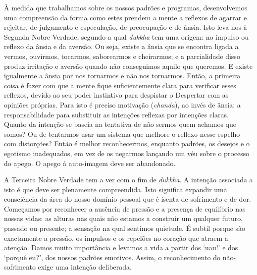 À medida que trabalhamos sobre os nossos padrões e programas, desenvolvemos uma compreensão da forma como estes prendem a mente a reflexos de agarrar e rejeitar, de julgamento e especulação, de preocupação e de ânsia. Isto leva-nos à Segunda Nobre Verdade, segundo a qual \emph{dukkha} tem uma origem: no impulso ou reflexo da ânsia e da aversão. Ou seja, existe a ânsia que se encontra ligada a vermos, ouvirmos, tocarmos, saborearmos e cheirarmos; e a parcialidade disso produz irritação e aversão quando não conseguimos aquilo que queremos. E existe igualmente a ânsia por nos tornarmos e não nos tornarmos. Então, a primeira coisa é fazer com que a mente fique suficientemente clara para verificar esses reflexos, devido ao seu poder instintivo para despistar o Despertar com as opiniões próprias. Para isto é preciso motivação (\emph{chanda}), ao invés de ânsia: a responsabilidade para substituir as intenções reflexas por intenções claras. Quanto da intenção se baseia na tentativa de não sermos quem achamos que somos? Ou de tentarmos usar um sistema que melhore o reflexo nesse espelho com distorções? Então é melhor reconhecermos, enquanto padrões, os desejos e o egotismo inadequados, em vez de os negarmos lançando um véu sobre o processo do apego. O apego à auto-imagem deve ser abandonado.

A Terceira Nobre Verdade tem a ver com o fim de \emph{dukkha}. A intenção associada a isto é que deve ser plenamente compreendida. Isto significa expandir uma consciência da área do nosso domínio pessoal que é isenta de sofrimento e de dor. Começamos por reconhecer a ausência de pressão e a presença de equilíbrio nas nossas vidas: as alturas nas quais não estamos a construir um qualquer futuro, passado ou presente; a sensação na qual sentimos quietude. É subtil porque são exactamente a pressão, os impulsos e os repelões no coração que atraem a atenção. Damos muito importância e levamos a vida a partir dos `uau!' e dos `porquê eu?', dos nossos padrões emotivos. Assim, o reconhecimento do não-sofrimento exige uma intenção deliberada.

